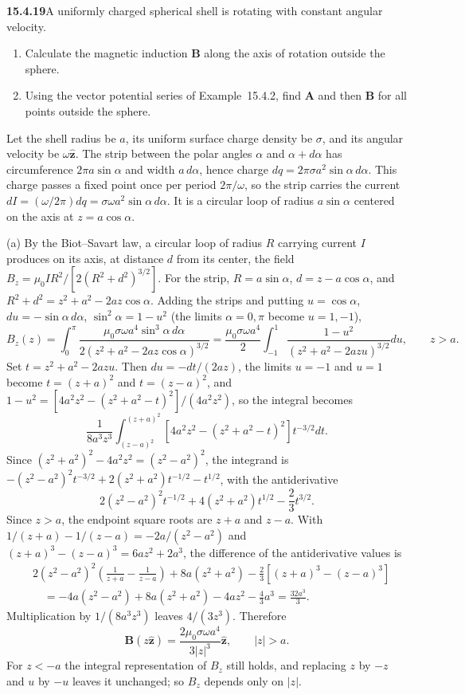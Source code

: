 \par\bigskip
\noindent\textbf{15.4.19}\quad A uniformly charged spherical shell is
rotating with constant angular velocity.
\begin{enumerate}
\item[(a)] Calculate the magnetic induction $\mathbf{B}$ along the
axis of rotation outside the sphere.
\item[(b)] Using the vector potential series of Example~15.4.2, find
$\mathbf{A}$ and then $\mathbf{B}$ for all points outside the sphere.
\end{enumerate}
\solution
Let the shell radius be $a$, its uniform surface charge density be
$\sigma$, and its angular velocity be $\omega\hat{\mathbf z}$.
The strip between the polar angles $\alpha$ and $\alpha+d\alpha$ has
circumference $2\pi a\sin\alpha$ and width $a\,d\alpha$, hence charge
$dq=2\pi\sigma a^2\sin\alpha\,d\alpha$. This charge passes a fixed
point once per period $2\pi/\omega$, so the strip carries the current
$dI=(\omega/2\pi)dq=\sigma\omega a^2\sin\alpha\,d\alpha$.
It is a circular loop of radius $a\sin\alpha$ centered on the axis at
$z=a\cos\alpha$.

(a) By the Biot--Savart law, a circular loop of radius $R$ carrying
current $I$ produces on its axis, at distance $d$ from its center, the
field $B_z=\mu_0IR^2/[2(R^2+d^2)^{3/2}]$. For the strip, $R=a\sin\alpha$,
$d=z-a\cos\alpha$, and
$R^2+d^2=z^2+a^2-2az\cos\alpha$. Adding the strips and putting
$u=\cos\alpha$, $du=-\sin\alpha\,d\alpha$, $\sin^2\alpha=1-u^2$
(the limits $\alpha=0,\pi$ become $u=1,-1$),
\[
B_z(z)=\int_0^\pi\frac{\mu_0\sigma\omega a^4\sin^3\alpha\,d\alpha}
{2(z^2+a^2-2az\cos\alpha)^{3/2}}
=\frac{\mu_0\sigma\omega a^4}{2}
\int_{-1}^1\frac{1-u^2}{(z^2+a^2-2azu)^{3/2}}du,\qquad z>a.
\]
Set $t=z^2+a^2-2azu$. Then $du=-dt/(2az)$, the limits $u=-1$ and
$u=1$ become $t=(z+a)^2$ and $t=(z-a)^2$, and
$1-u^2=[4a^2z^2-(z^2+a^2-t)^2]/(4a^2z^2)$, so the integral becomes
\[
\frac1{8a^3z^3}\int_{(z-a)^2}^{(z+a)^2}
[4a^2z^2-(z^2+a^2-t)^2]t^{-3/2}dt.
\]
Since $(z^2+a^2)^2-4a^2z^2=(z^2-a^2)^2$, the integrand is
$-(z^2-a^2)^2t^{-3/2}+2(z^2+a^2)t^{-1/2}-t^{1/2}$, with the
antiderivative
\[
2(z^2-a^2)^2t^{-1/2}
+4(z^2+a^2)t^{1/2}-\frac23t^{3/2}.
\]
Since $z>a$, the endpoint square roots are $z+a$ and $z-a$.
With $1/(z+a)-1/(z-a)=-2a/(z^2-a^2)$ and
$(z+a)^3-(z-a)^3=6az^2+2a^3$, the difference of the antiderivative
values is
\begin{align*}
&2(z^2-a^2)^2\left(\frac1{z+a}-\frac1{z-a}\right)
+8a(z^2+a^2)-\frac23[(z+a)^3-(z-a)^3]\\
&\quad=-4a(z^2-a^2)+8a(z^2+a^2)-4az^2-\frac43a^3
=\frac{32a^3}{3}.
\end{align*}
Multiplication by $1/(8a^3z^3)$ leaves $4/(3z^3)$. Therefore
\[
\boxed{\mathbf B(z\hat{\mathbf z})
=\frac{2\mu_0\sigma\omega a^4}{3|z|^3}\hat{\mathbf z}},
\qquad |z|>a.
\]
For $z<-a$ the integral representation of $B_z$ still holds, and
replacing $z$ by $-z$ and $u$ by $-u$ leaves it unchanged; so $B_z$
depends only on $|z|$.

